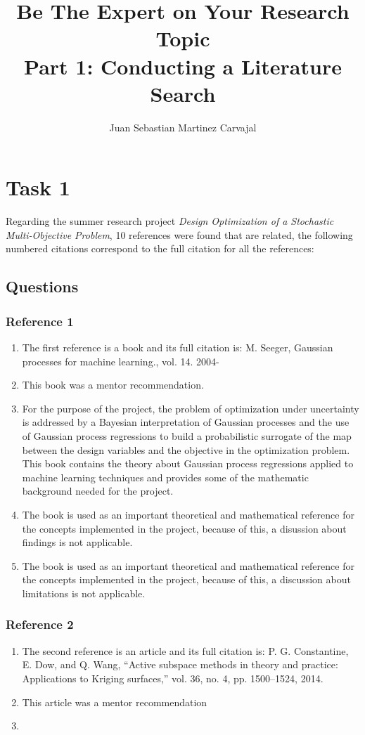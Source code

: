 \documentclass{journal}
\title{\textbf{Be The Expert on Your Research Topic}\\Part 1: Conducting a Literature Search}
\author{Juan Sebastian Martinez Carvajal}
\date{}
\begin{document}
\maketitle
\hrulefill

\section{Task 1}
Regarding the summer research project \textit{Design Optimization of a Stochastic Multi-Objective Problem}, 10 references were found that are related, the following numbered citations correspond to the full citation for all the references:\\




\subsection{Questions}
\subsubsection{Reference 1}
\begin{enumerate}
	\item The first reference is a book and its full citation is: M. Seeger, Gaussian processes for machine learning., vol. 14. 2004-
	\item This book was a mentor recommendation.
	\item For the purpose of the project, the problem of optimization under uncertainty is addressed by a Bayesian interpretation of Gaussian processes and the use of Gaussian process regressions to build a probabilistic surrogate of the map between the design variables and the objective in the optimization problem. This book contains the theory about Gaussian process regressions applied to machine learning techniques and provides some of the mathematic background needed for the project.
	\item The book is used as an important theoretical and mathematical reference for the concepts implemented in the project, because of this, a disussion about findings is not applicable.
	\item The book is used as an important theoretical and mathematical reference for the concepts implemented in the project, because of this, a discussion about limitations is not applicable.
\end{enumerate}

\subsubsection{Reference 2}
\begin{enumerate}
	\item The second reference is an article and its full citation is: P. G. Constantine, E. Dow, and Q. Wang, “Active subspace methods in theory and practice: Applications to Kriging surfaces,” vol. 36, no. 4, pp. 1500–1524, 2014.
	\item This article was a mentor recommendation
	\item 
\end{enumerate}
\end{document}
